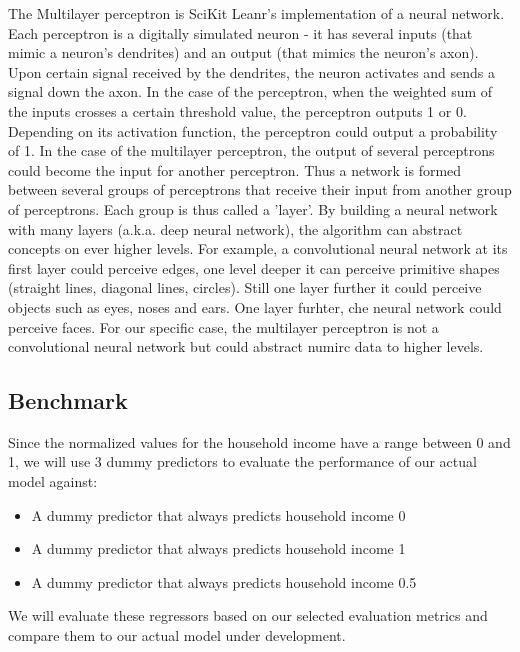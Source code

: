\documentclass{article}
\begin{document}
The Multilayer perceptron is SciKit Leanr's implementation of a neural network. Each perceptron is a digitally simulated neuron - it has several inputs (that mimic a neuron's dendrites) and an output (that mimics the neuron's axon). Upon certain signal received by the dendrites, the neuron activates and sends a signal down the axon. In the case of the perceptron, when the weighted sum of the inputs crosses a certain threshold value, the perceptron outputs 1 or 0. Depending on its activation function, the perceptron could output a probability of 1. In the case of the multilayer perceptron, the output of several perceptrons could become the input for another perceptron. Thus a network is formed between several groups of perceptrons that receive their input from another group of perceptrons. Each group is thus called a 'layer'. By building a neural network with many layers (a.k.a. deep neural network), the algorithm can abstract concepts on ever higher levels. For example, a convolutional neural network at its first layer could perceive edges, one level deeper it can perceive primitive shapes (straight lines, diagonal lines, circles). Still one layer further it could perceive objects such as eyes, noses and ears. One layer furhter, che neural network could perceive faces. For our specific case, the multilayer perceptron is not a convolutional neural network but could abstract numirc data to higher levels.

\subsection{Benchmark}
Since the normalized values for the household income have a range between 0 and 1, we will use 3 dummy predictors to evaluate the performance of our actual model against:
\begin{itemize}
  \item A dummy predictor that always predicts household income 0
  \item A dummy predictor that always predicts household income 1
  \item A dummy predictor that always predicts household income 0.5
\end{itemize}
We will evaluate these regressors based on our selected evaluation metrics and compare them to our actual model under development.
\end{document}
